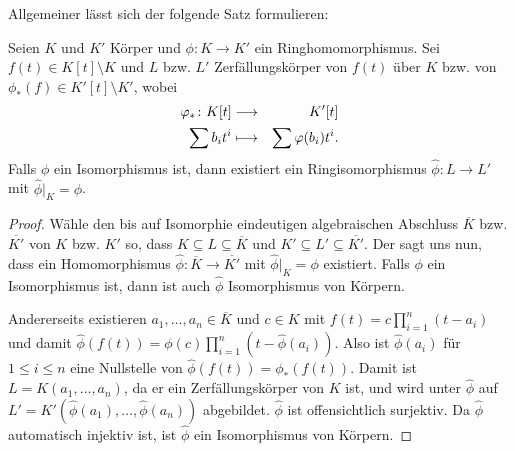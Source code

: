 \documentclass[12pt,a4paper]{scrartcl}
\begin{document}
Allgemeiner lässt sich der folgende Satz formulieren:
\begin{satz} \label{thm:18.6}
	Seien $K$ und $K'$ Körper und $\phi\colon K\to K'$ ein Ringhomomorphismus. Sei $f(t)\in K[t]\setminus K$ und $L$ bzw. $L'$ Zerfällungskörper von $f(t)$ über $K$ bzw. von $\phi_{*}(f)\in K'[t]\setminus K'$, wobei 
	\begin{eqnarray*}
		\varphi_{*}\colon K[t] & \longrightarrow & K'[t]\\
		\sum b_it^i & \longmapsto & \sum \varphi(b_i)t^i.
	\end{eqnarray*}
	Falls $\phi$ ein Isomorphismus ist, dann existiert ein Ringisomorphismus $\hat \phi\colon L\to L'$ mit $\hat\phi|_K = \phi$.
\end{satz}
\begin{proof}
	Wähle den bis auf Isomorphie eindeutigen algebraischen Abschluss $\overline{K}$ bzw. $\overline{K'}$ von $K$ bzw. $K'$ so, dass $K\subseteq L\subseteq \overline{K}$ und $K'\subseteq L'\subseteq \overline{K'}$. Der  sagt uns nun, dass ein Homomorphismus $\hat\phi\colon \overline{K}\to\overline{K'}$ mit $\hat\phi|_K = \phi$ existiert. Falls $\phi$ ein Isomorphismus ist, dann ist auch $\hat\phi$ Isomorphismus von Körpern.
	
	Andererseits existieren $a_1,\dots, a_n\in \overline{K}$ und $c\in K$ mit $f(t) = c\prod_{i = 1}^n(t-a_i)$ und damit $\hat\phi(f(t)) = \phi(c)\prod_{i = 1}^n(t-\hat\phi(a_i))$. Also ist $\hat\phi(a_i)$ für $1\leq i\leq n$ eine Nullstelle von $\hat\phi(f(t)) = \phi_{*}(f(t))$. Damit ist $L = K(a_1,\dots, a_n)$, da er ein Zerfällungskörper von $K$ ist, und wird unter $\hat\phi$ auf $L' = K'(\hat\phi(a_1),\dots ,\hat\phi(a_n))$ abgebildet. $\hat{\phi}$ ist offensichtlich surjektiv. Da $\hat{\phi}$ automatisch injektiv ist, ist $\hat\phi$ ein Isomorphismus von Körpern.
\end{proof}
\end{document}
